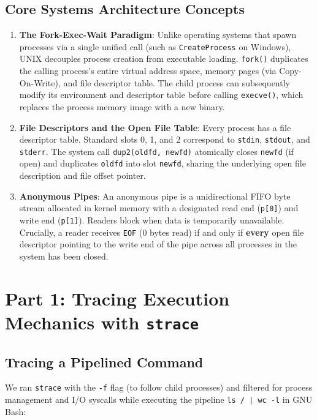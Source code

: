 \documentclass[12pt,a4paper]{article}
\begin{document}
\subsection{Core Systems Architecture Concepts}
\begin{enumerate}
    \item \textbf{The Fork-Exec-Wait Paradigm}: Unlike operating systems that spawn processes via a single unified call (such as \texttt{CreateProcess} on Windows), UNIX decouples process creation from executable loading. \texttt{fork()} duplicates the calling process's entire virtual address space, memory pages (via Copy-On-Write), and file descriptor table. The child process can subsequently modify its environment and descriptor table before calling \texttt{execve()}, which replaces the process memory image with a new binary.
    \item \textbf{File Descriptors and the Open File Table}: Every process has a file descriptor table. Standard slots 0, 1, and 2 correspond to \texttt{stdin}, \texttt{stdout}, and \texttt{stderr}. The system call \texttt{dup2(oldfd, newfd)} atomically closes \texttt{newfd} (if open) and duplicates \texttt{oldfd} into slot \texttt{newfd}, sharing the underlying open file description and file offset pointer.
    \item \textbf{Anonymous Pipes}: An anonymous pipe is a unidirectional FIFO byte stream allocated in kernel memory with a designated read end (\texttt{p[0]}) and write end (\texttt{p[1]}). Readers block when data is temporarily unavailable. Crucially, a reader receives \texttt{EOF} (0 bytes read) if and only if \textbf{every} open file descriptor pointing to the write end of the pipe across all processes in the system has been closed.
\end{enumerate}

\newpage

\section{Part 1: Tracing Execution Mechanics with \texttt{strace}}

\subsection{Tracing a Pipelined Command}
We ran \texttt{strace} with the \texttt{-f} flag (to follow child processes) and filtered for process management and I/O syscalls while executing the pipeline \texttt{ls / | wc -l} in GNU Bash:
\end{document}
